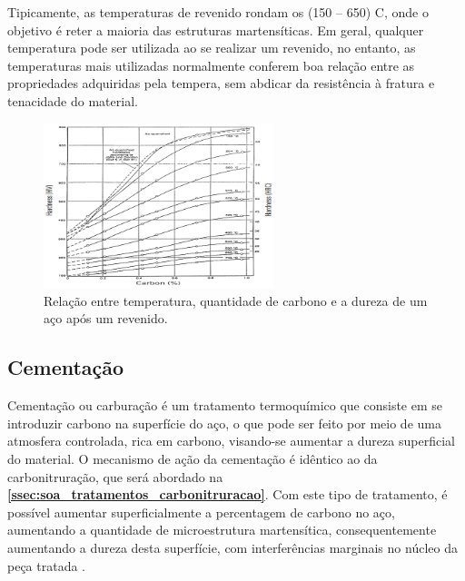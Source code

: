 \par
Tipicamente, as temperaturas de revenido rondam os (150 – 650) \textdegree C, onde o objetivo é reter a maioria das estruturas martensíticas. Em geral, qualquer temperatura pode ser utilizada ao se realizar um revenido, no entanto, as temperaturas mais utilizadas normalmente conferem boa relação entre as propriedades adquiridas pela tempera, sem abdicar da resistência à fratura e tenacidade do material.
\begin{figure}[htb]
    \centering
    \includegraphics[width = 0.6\textwidth]{Figures/Cap2/Hardness_Temperature_Carbon.png}
    \caption[Relação Revenido: Dureza x Temperatura]%
    {Relação entre temperatura, quantidade de carbono e a dureza de um aço após um revenido\cite{Krauss2001}.}
    \label{fig:Hardness_Temperature_Carbon}
\end{figure}
\subsection{Cementação} \label{ssec:soa_tratamentos_cementação}

Cementação ou carburação é um tratamento termoquímico que consiste em se introduzir carbono na superfície do aço, o que pode ser feito por meio de uma atmosfera controlada, rica em carbono, visando-se aumentar a dureza superficial do material. O mecanismo de ação da cementação é idêntico ao da carbonitruração, que será abordado na \textbf{\ref{ssec:soa_tratamentos_carbonitruracao}}. Com este tipo de tratamento, é possível aumentar superficialmente a percentagem de carbono no aço, aumentando a quantidade de microestrutura martensítica, consequentemente aumentando a dureza desta superfície, com interferências marginais no núcleo da peça tratada \cite{Oberg1989}.

